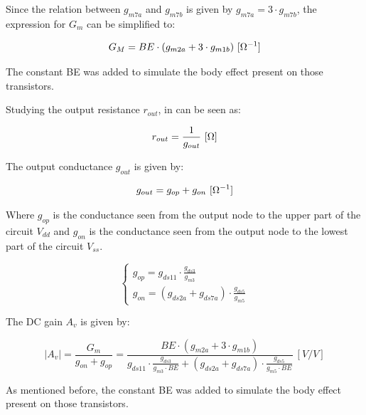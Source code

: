 Since the relation between $g_{m7a}$ and $g_{m7b}$ is given by $g_{m7a} = 3 \cdot g_{m7b}$, the expression for $G_m$ can be simplified to:  

\begin{equation}
    G_M = BE \cdot (g_{m2a} + 3 \cdot g_{m1b}) \ [\Omega ^{-1}] \\
    \label{eq:GM_BE}
\end{equation}

The constant BE was added to simulate the body effect present on those transistors.

Studying the output resistance $r_{out}$, in can be seen as:

\begin{equation}
    r_{out} = \frac{1}{g_{out}} \ [\Omega] \\
    \label{eq:rout}
\end{equation}

The output conductance $g_{out}$ is given by:

\begin{equation}
    g_{out} = g_{op} + g_{on} \ [\Omega ^{-1}] \\
    \label{eq:gout}
\end{equation}

Where $g_{op}$ is the conductance seen from the output node to the upper part of the circuit $V_{dd}$ and $g_{on}$ is the conductance seen from the output node to the lowest part of the circuit $V_{ss}$.

\begin{equation}
    \begin{cases}
        g_{op} = g_{ds11} \cdot \frac{g_{ds3}}{g_{m3}} \\
        g_{on} = \left( g_{ds2a} + g_{ds7a} \right) \cdot \frac{g_{ds5}}{g_{m5}}
    \end{cases}
    \label{eq:output_conductance}
\end{equation}

The DC gain $A_v$ is given by:

\begin{equation}
    |A_v| = \frac{G_m}{g_{on} + g_{op}} = \frac{BE \cdot (g_{m2a} + 3 \cdot g_{m1b})}{g_{ds11} \cdot \frac{g_{ds3}}{g_{m3}\cdot BE} + (g_{ds2a} + g_{ds7a}) \cdot \frac{g_{ds5}}{g_{m5} \cdot BE}} \ [V/V]
    \label{eq:Av}
\end{equation}

As mentioned before, the constant BE was added to simulate the body effect present on those transistors.


